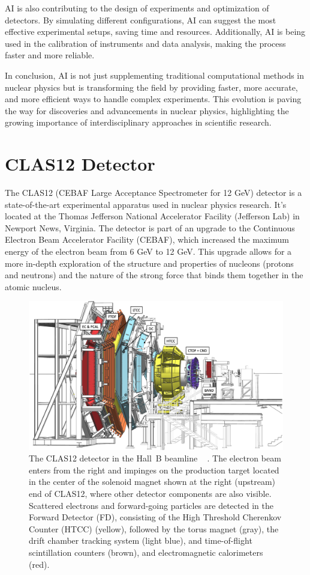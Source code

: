 \documentclass[preprint,12pt]{elsarticle}
\begin{document}
AI is also contributing to the design of experiments and optimization of detectors. By simulating different configurations, AI can suggest the most effective experimental setups, saving time and resources. Additionally, AI is being used in the calibration of instruments and data analysis, making the process faster and more reliable.

In conclusion, AI is not just supplementing traditional computational methods in nuclear physics but is transforming the field by providing faster, more accurate, and more efficient ways to handle complex experiments. This evolution is paving the way for discoveries and advancements in nuclear physics, highlighting the growing importance of interdisciplinary approaches in scientific research.

\section{CLAS12 Detector}

The CLAS12 (CEBAF Large Acceptance Spectrometer for 12 GeV) detector is a state-of-the-art experimental apparatus used in nuclear physics research. It's located at the Thomas Jefferson National Accelerator Facility (Jefferson Lab) in Newport News, Virginia. The detector is part of an upgrade to the Continuous Electron Beam Accelerator Facility (CEBAF), which increased the maximum energy of the electron beam from 6 GeV to 12 GeV. This upgrade allows for a more in-depth exploration of the structure and properties of nucleons (protons and neutrons) and the nature of the strong force that binds them together in the atomic nucleus.


\begin{figure}[h!]
\centering
\centerline{\includegraphics[width=0.7\columnwidth]{images/CLAS12-side.png}}
\caption{The CLAS12 detector in the Hall~B beamline ~\cite{Burkert:2020akg} . The electron beam enters from the right and impinges on
  the production target located in the center of the solenoid magnet shown at the right (upstream) end of CLAS12,
  where other detector components are also visible. Scattered electrons and forward-going particles are detected
  in the Forward Detector (FD), consisting of the High Threshold Cherenkov Counter (HTCC) (yellow), 
  followed by the torus magnet (gray), the drift chamber tracking system (light blue),
  and time-of-flight scintillation counters (brown), and electromagnetic calorimeters (red). } 
\label{fig:CLAS12}
\end{figure}
\end{document}

